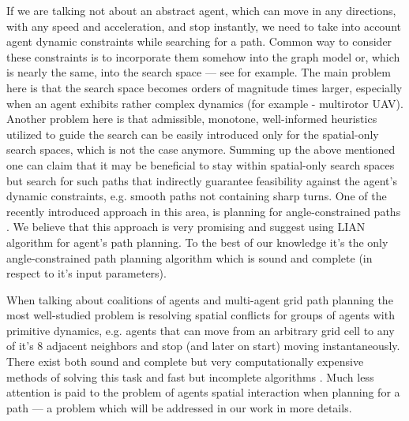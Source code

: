 \documentclass[runningheads,a4paper]{llncs}
\begin{document}
If we are talking not about an abstract agent, which can move in any directions, with any speed and acceleration, and stop instantly, we need to take into account agent dynamic constraints while searching for a path. Common way to consider these constraints is to incorporate them somehow into the graph model or, which is nearly the same, into the search space --- see \cite{Kuwata2009} for example. The main problem here is that the search space becomes orders of magnitude times larger, especially when an agent exhibits rather complex dynamics (for example - multirotor UAV).  Another problem here is that admissible, monotone, well-informed heuristics utilized to guide the search can be easily introduced only for the spatial-only search spaces, which is not the case anymore. Summing up the above mentioned one can claim that it may be beneficial to stay within spatial-only search spaces but search for such paths that indirectly guarantee feasibility against the agent's dynamic constraints, e.g. smooth paths not containing sharp turns.  One of the recently introduced approach in this area, is planning for angle-constrained paths \cite{Kim2014}. We believe that this approach is very promising and suggest using LIAN algorithm \cite{Yakovlev2015} for agent's path planning. To the best of our knowledge it's the only angle-constrained path planning algorithm which is sound and complete (in respect to it's input parameters). 

When talking about coalitions of agents and multi-agent grid path planning the most well-studied problem is resolving spatial conflicts for groups of agents with primitive dynamics, e.g. agents that can move from an arbitrary grid cell to any of it's 8 adjacent neighbors and stop (and later on start) moving instantaneously. There exist both sound and complete but very computationally expensive methods of solving this task \cite{Standley2010} and fast but incomplete algorithms \cite{Wang2008,Silver2006}. Much less attention is paid to the problem of agents spatial interaction when planning for a path --- a problem which will be addressed in our work in more details.
\end{document}
